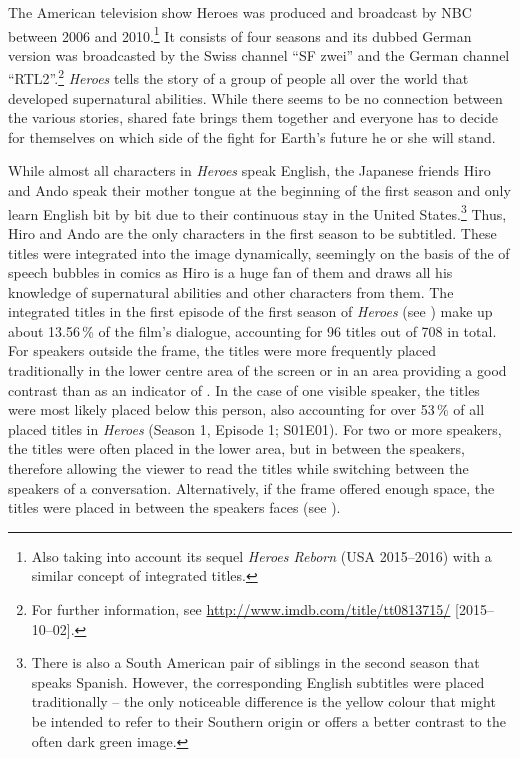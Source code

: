 The American television show Heroes was produced and broadcast by NBC between 2006 and 2010.\footnote{Also taking into account its sequel \textit{Heroes Reborn} (USA 2015--2016) with a similar concept of integrated titles.} It consists of four seasons and its dubbed German version was broadcasted by the Swiss channel “SF zwei” and the German channel “RTL2”.\footnote{For further information, see \url{http://www.imdb.com/title/tt0813715/} [2015--10--02].} \textit{Heroes} tells the story of a group of people all over the world that developed supernatural abilities. While there seems to be no connection between the various stories, shared fate brings them together and everyone has to decide for themselves on which side of the fight for Earth’s future he or she will stand.

While almost all characters in \textit{Heroes} speak English, the Japanese friends Hiro and Ando speak their mother tongue at the beginning of the first season and only learn English bit by bit due to their continuous stay in the United States.\footnote{There is also a South American pair of siblings in the second season that speaks Spanish. However, the corresponding English subtitles were placed traditionally – the only noticeable difference is the yellow colour that might be intended to refer to their Southern origin or offers a better contrast to the often dark green image.} Thus, Hiro and Ando are the only characters in the first season to be subtitled. These titles were integrated into the image dynamically, seemingly on the basis of the  of speech bubbles in comics as Hiro is a huge fan of them and draws all his knowledge of supernatural abilities and other characters from them. The integrated titles in the first episode of the first season of \textit{Heroes} (see ) make up about 13.56\,\% of the film’s dialogue, accounting for 96 titles out of 708 in total. For speakers outside the frame, the titles were more frequently placed traditionally in the lower centre area of the screen or in an area providing a good contrast than as an indicator of . In the case of one visible speaker, the titles were most likely placed below this person, also accounting for over 53\,\% of all placed titles in \textit{Heroes} (Season 1, Episode 1; S01E01). For two or more speakers, the titles were often placed in the lower area, but in between the speakers, therefore allowing the viewer to read the titles while switching between the speakers of a conversation. Alternatively, if the frame offered enough space, the titles were placed in between the speakers faces (see ).

